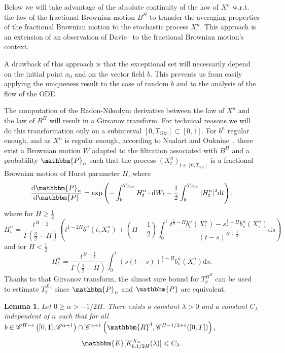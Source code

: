 \documentclass[a4paper,11pt]{article}
\newcommand{\mathd}{\mathrm{d}}
\newtheorem{lemma}[theorem]{Lemma}
\newcommand{\CC}{\mathscr C}
\begin{document}
Below we will take advantage of the absolute continuity of the law of $X^{n}$
w.r.t. the law of the fractional Brownian motion $B^{H}$ to transfer the averaging properties of the
fractional Brownian motion to the stochastic process $X^{n}$. This approach is an extension of an
observation of Davie~{\cite{MR2377011}} to the fractional Brownian motion's context.

A drawback of this approach is that the exceptional set will necessarily
depend on the initial point $x_{0}$ and on the vector field $b$. This prevents us
from easily applying the uniqueness result to the case of random $b$ and to the
analysis of the flow of the ODE.

The computation of the Radon-Nikodym derivative between the law of $X^{n}$ and
the law of $B^{H}$ will result in a Girsanov transform. For technical reasons
we will do this transformation only on a subinterval $[0,T_{Gir} ] \subset
[0,1]$. For $b^{n}$ regular enough, and as $X^{n}$ is regular enough,
according to Nualart and Ouknine~{\cite{MR1934157}}, there exist a Brownian
motion $W$ adapted to the filtration associated with $B^{H}$ and a probability
$\mathbbm{P}_{n}$ such that the process $(X^{n}_{t} )_{t \in [0,T_{Gir} ]}$ is
a fractional Brownian motion of Hurst parameter $H$, where
\[ \frac{\mathd \mathbbm{P}_{n}}{\mathd \mathbbm{P}} = \exp   \left( -
   \int_{0}^{T_{Gir}} H_{t}^{n} \cdot \mathd W_{t} - \frac{1}{2} 
   \int_{0}^{T_{Gir}} | H^{n}_{t} |^{2} \mathd t \right), \]
 where for $H \ge \frac{1}{2}$
\[ H_{t}^{n} = \frac{t^{H- \frac{1}{2}}}{\Gamma ( \frac{3}{2} -H)}  \left(
   t^{1-2H} b^{n} (t,X^{n}_{t} )+ \left( H- \frac{1}{2} \right)  \int_{0}^{t}
   \frac{t^{\frac{1}{2} -H} b^{n}_{t} (X^{n}_{t} )-s^{\frac{1}{2} -H}
   b^{n}_{s} (X^{n}_{s} )}{(t-s)^{H+ \frac{1}{2}}} \mathd s \right) \]
and for $H< \frac{1}{2}$
\[ H_{t}^{n} = \frac{t^{H- \frac{1}{2}}}{\Gamma ( \frac{1}{2} -H)} 
   \int_{0}^{t} ( s(t-s) )^{\frac{1}{2} -H} b^{n}_{s} (X^{n}_{s} ) \mathd s. \]
Thanks to that Girsanov transform, the almost sure bound for $T^{B^{H}}_{b}$
can be used to estimate $T^{X_{n}}_{b}$ since $\mathbbm{P}_{n}$ and
$\mathbbm{P}$ are equivalent.

\begin{lemma}
  \label{majoration Qn}Let $0 \geqslant \alpha >-1/2H$. There exists a
  constant $\lambda >0$ and a constant $C_{\lambda}$ independent of $n$ such
  that for all $b \in \CC^{H- \varepsilon} \left( [ 0,1 ] ; \CC^{\alpha +1}
  \right) \cap \CC^{\alpha +1} \left( \mathbbm{R}^{d} , \CC^{H-1/2+
  \varepsilon} ( [ 0,T ] ) \right)$,
  \[ \mathbbm{E} [ K^{X_{n}}_{b,1/2H} ( \lambda ) ] \leqslant C_{\lambda} .\]
\end{lemma}
\end{document}
